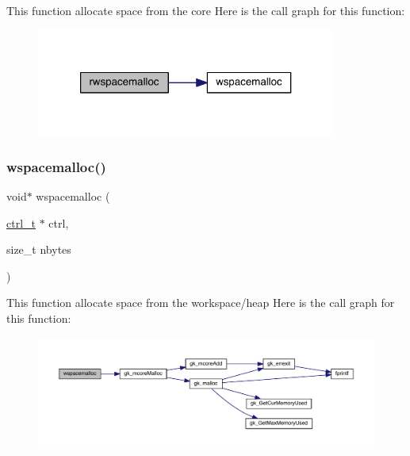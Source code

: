 This function allocate space from the core Here is the call graph for this function\+:\nopagebreak
\begin{figure}[H]
\begin{center}
\leavevmode
\includegraphics[width=280pt]{a00984_ad1c3f444b6873f0bfdb82e1bb98372d5_cgraph}
\end{center}
\end{figure}
\mbox{\label{a00984_a555f2ae3f4e5561c9b1ef592bf0f8476}} 
\subsubsection{\texorpdfstring{wspacemalloc()}{wspacemalloc()}}
{\footnotesize\ttfamily void$\ast$ wspacemalloc (\begin{DoxyParamCaption}\item[{\hyperlink{a00742}{ctrl\+\_\+t} $\ast$}]{ctrl,  }\item[{size\+\_\+t}]{nbytes }\end{DoxyParamCaption})}

This function allocate space from the workspace/heap Here is the call graph for this function\+:\nopagebreak
\begin{figure}[H]
\begin{center}
\leavevmode
\includegraphics[width=350pt]{a00984_a555f2ae3f4e5561c9b1ef592bf0f8476_cgraph}
\end{center}
\end{figure}
